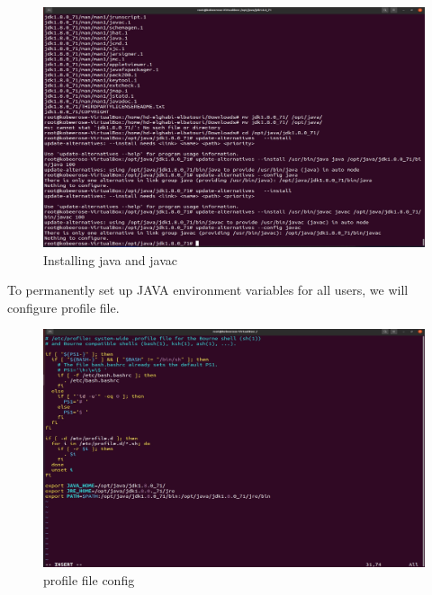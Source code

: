 \begin{spacing}{1.2}
\begin{figure}[!htb] 
\begin{center} 
\includegraphics[width=1\linewidth]{Big_Data/Hadoop/Apache Hadoop Installation/Installing java and javac} 
\end{center} 
\caption{Installing java and javac} 
\end{figure} 
\FloatBarrier


\par To permanently set up JAVA environment variables for all users, we will configure profile file.
\\
\begin{figure}[!htb] 
\begin{center} 
\includegraphics[width=1\linewidth]{Big_Data/Hadoop/Apache Hadoop Installation/profile file config} 
\end{center} 
\caption{profile file config} 
\end{figure} 
\FloatBarrier


\end{spacing}
